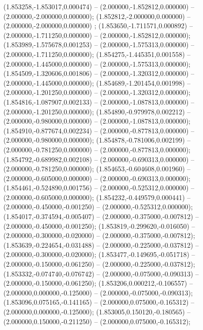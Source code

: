  (1.853258,-1.853017,0.000474) -- (2.000000,-1.852812,0.000000) -- (2.000000,-2.000000,0.000000);
 (1.852812,-2.000000,0.000000) -- (2.000000,-2.000000,0.000000) ;
 (1.853650,-1.711571,0.000892) -- (2.000000,-1.711250,0.000000) -- (2.000000,-1.852812,0.000000);
 (1.853989,-1.575678,0.001253) -- (2.000000,-1.575313,0.000000) -- (2.000000,-1.711250,0.000000);
 (1.854275,-1.445351,0.001558) -- (2.000000,-1.445000,0.000000) -- (2.000000,-1.575313,0.000000);
 (1.854509,-1.320606,0.001806) -- (2.000000,-1.320312,0.000000) -- (2.000000,-1.445000,0.000000);
 (1.854689,-1.201454,0.001998) -- (2.000000,-1.201250,0.000000) -- (2.000000,-1.320312,0.000000);
 (1.854816,-1.087907,0.002133) -- (2.000000,-1.087813,0.000000) -- (2.000000,-1.201250,0.000000);
 (1.854890,-0.979978,0.002212) -- (2.000000,-0.980000,0.000000) -- (2.000000,-1.087813,0.000000);
 (1.854910,-0.877674,0.002234) -- (2.000000,-0.877813,0.000000) -- (2.000000,-0.980000,0.000000);
 (1.854878,-0.781006,0.002199) -- (2.000000,-0.781250,0.000000) -- (2.000000,-0.877813,0.000000);
 (1.854792,-0.689982,0.002108) -- (2.000000,-0.690313,0.000000) -- (2.000000,-0.781250,0.000000);
 (1.854653,-0.604608,0.001960) -- (2.000000,-0.605000,0.000000) -- (2.000000,-0.690313,0.000000);
 (1.854461,-0.524890,0.001756) -- (2.000000,-0.525312,0.000000) -- (2.000000,-0.605000,0.000000);
 (1.854232,-0.449579,0.000441) -- (2.000000,-0.450000,-0.001250) -- (2.000000,-0.525312,0.000000);
 (1.854017,-0.374594,-0.005407) -- (2.000000,-0.375000,-0.007812) -- (2.000000,-0.450000,-0.001250);
 (1.853819,-0.299620,-0.016050) -- (2.000000,-0.300000,-0.020000) -- (2.000000,-0.375000,-0.007812);
 (1.853639,-0.224654,-0.031488) -- (2.000000,-0.225000,-0.037812) -- (2.000000,-0.300000,-0.020000);
 (1.853477,-0.149695,-0.051718) -- (2.000000,-0.150000,-0.061250) -- (2.000000,-0.225000,-0.037812);
 (1.853332,-0.074740,-0.076742) -- (2.000000,-0.075000,-0.090313) -- (2.000000,-0.150000,-0.061250);
 (1.853206,0.000212,-0.106557) -- (2.000000,0.000000,-0.125000) -- (2.000000,-0.075000,-0.090313);
 (1.853096,0.075165,-0.141165) -- (2.000000,0.075000,-0.165312) -- (2.000000,0.000000,-0.125000);
 (1.853005,0.150120,-0.180565) -- (2.000000,0.150000,-0.211250) -- (2.000000,0.075000,-0.165312);

